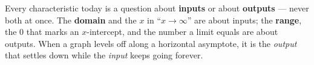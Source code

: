 \documentclass[10pt]{article}
\begin{document}
\vspace{0.14in}

\begin{remindbox}
\small
Every characteristic today is a question about \textbf{inputs} or about \textbf{outputs} ---
never both at once. The \textbf{domain} and the $x$ in ``$x \to \infty$'' are about inputs;
the \textbf{range}, the 0 that marks an $x$-intercept, and the number a limit equals are
about outputs.
When a graph levels off along a horizontal asymptote, it is the \emph{output} that settles
down while the \emph{input} keeps going forever.
\end{remindbox}
\end{document}
